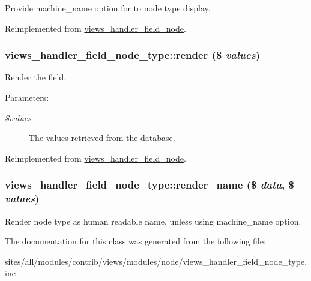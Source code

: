 Provide machine\_\-name option for to node type display. 

Reimplemented from \hyperlink{classviews__handler__field__node_f3d8a04be282a20079ea4fb82e768910}{views\_\-handler\_\-field\_\-node}.\hypertarget{classviews__handler__field__node__type_13c9a516cca49870a1603fdd26071851}{
\subsubsection[{render}]{\setlength{\rightskip}{0pt plus 5cm}views\_\-handler\_\-field\_\-node\_\-type::render (\$ {\em values})}}
\label{classviews__handler__field__node__type_13c9a516cca49870a1603fdd26071851}


Render the field.

\begin{Desc}
\item[Parameters:]
\begin{description}
\item[{\em \$values}]The values retrieved from the database. \end{description}
\end{Desc}


Reimplemented from \hyperlink{classviews__handler__field__node_fe7681e1188ad74ce9b604ad3ba864c0}{views\_\-handler\_\-field\_\-node}.\hypertarget{classviews__handler__field__node__type_16f19e2f652fd883b10a568eba122d5b}{
\subsubsection[{render\_\-name}]{\setlength{\rightskip}{0pt plus 5cm}views\_\-handler\_\-field\_\-node\_\-type::render\_\-name (\$ {\em data}, \/  \$ {\em values})}}
\label{classviews__handler__field__node__type_16f19e2f652fd883b10a568eba122d5b}


Render node type as human readable name, unless using machine\_\-name option. 

The documentation for this class was generated from the following file:\begin{CompactItemize}
\item 
sites/all/modules/contrib/views/modules/node/views\_\-handler\_\-field\_\-node\_\-type.inc\end{CompactItemize}
